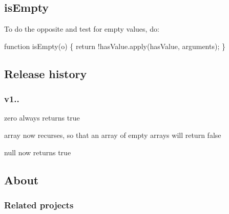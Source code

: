 \subsection*{is\+Empty}

To do the opposite and test for empty values, do\+:


\begin{DoxyCode}
function isEmpty(o) \{
  return !hasValue.apply(hasValue, arguments);
\}
\end{DoxyCode}


\subsection*{Release history}

\subsubsection*{v1..}


\begin{DoxyItemize}
\item {\ttfamily zero} always returns true
\item {\ttfamily array} now recurses, so that an array of empty arrays will return {\ttfamily false}
\item {\ttfamily null} now returns true
\end{DoxyItemize}

\subsection*{About}

\subsubsection*{Related projects}


